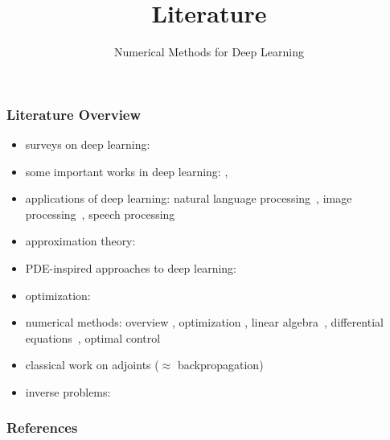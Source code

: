 \documentclass[12pt,fleqn]{beamer}
\title[Literature]{Literature}
\subtitle{Numerical Methods for Deep Learning}
\date{}
\begin{document}
\makebeamertitle

\begin{frame}
	\frametitle{Literature Overview}
	
	\begin{itemize}
		\item surveys on deep learning: \cite{bengio2009learning,lecun2015deep}
		\item some important works in deep learning: \cite{Rosenblatt1958,Rumelhart1986,LeCun1990,HuangEtAl2006,RainaEtAl2009,KrizhevskySutskeverHinton2012,IoffeSzegedy2015,he2016deep,he2016identity,UlyanovEtAl2016,LiEtAl2017},
		\item applications of deep learning: natural language processing~\cite{CollobertEtAl2011,BordesEtAl2014,JeanEtAl2014}, image processing~\cite{LeCun1990,KrizhevskySutskeverHinton2012}, speech processing~\cite{hinton2012deep}
		\item approximation theory: \cite{Cybenko1989,HornikEtAl1989}
		\item PDE-inspired approaches to deep learning: \cite{E2017, HaberRuthotto2017}
		\item optimization: ~\cite{RobbinsMonro1951,GoPe1973,GoPe03,OLearyRust2013,Bottou2012,Bertsekas2015,bottou2016optimization}
		\item numerical methods: overview \cite{AscherGreif2011}, optimization \cite{NocedalWright2006,BoydVandenberghe2004,Beck2014}, linear algebra~\cite{Saad2003,HansenNagyOLeary2006}, differential equations~\cite{AscherPetzold1998,Ascher2010}, optimal control~\cite{BorzSchulz2012}
		\item classical work on adjoints ($\approx$ backpropagation) \cite{bliss1919}
		\item inverse problems: \cite{Hansen1998,Vogel2002,Hansen2010}
	\end{itemize}
\end{frame}


\begin{frame}[allowframebreaks]
	\frametitle{References}
 


\end{frame}
\end{document}
